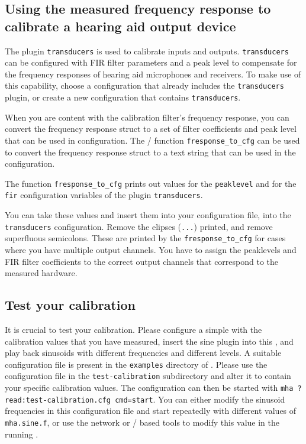 \documentclass[11pt,a4paper,twoside]{article}
\newcommand{\+}{\discretionary{\mbox{\scriptsize$\hookleftarrow$}}{}{}}
\begin{document}
\subsection{Using the measured frequency response to calibrate a hearing aid output device}

The \mha{} plugin \texttt{transducers} is used to calibrate inputs and outputs.
%
\texttt{transducers} can be configured with FIR filter parameters and a peak level
to compensate for the frequency responses of hearing aid microphones and receivers.
%
To make use of this capability, choose a \mha{} configuration that already includes
the \texttt{transducers} plugin, or create a new configuration that contains
\texttt{transducers}.

When you are content with the calibration filter's frequency response,
you can convert the frequency response struct to a set of filter
coefficients and peak level that can be used in \mha{} configuration.
%
The \Octave{}/\Matlab{} function \texttt{fresponse\_to\_cfg} can be
used to convert the frequency response struct to a text string that
can be used in the \mha{} configuration.

The function \texttt{fresponse\_to\_cfg} prints out values for the
\texttt{peaklevel} and for the \texttt{fir} configuration variables of
the \mha{} plugin \texttt{transducers}.

You can take these values and insert them into your configuration file,
into the \texttt{transducers} configuration.
%
Remove the elipses (\texttt{...}) printed, and remove superfluous
semicolons.
%
These are printed by the \texttt{fresponse\_to\_cfg} for cases where
you have multiple output channels. You have to assign the peaklevels
and FIR filter coefficients to the correct output channels that
correspond to the measured hardware.

\subsection{Test your calibration}

It is crucial to test your calibration. Please configure a simple \mha{} with the
calibration values that you have measured, insert the sine plugin into this \mha{},
and play back sinusoids with different frequencies and different levels.
%
A suitable configuration file is present in the \texttt{examples} directory of \mha{}.
%
Please use the configuration file in the \texttt{test-calibration} subdirectory
and alter it to contain your specific calibration values.
%
The configuration can then be started with
\texttt{mha ?read:test-calibration.cfg cmd=start}.
%
You can either modify the sinusoid frequencies in this configuration
file and start \mha{} repeatedly with different values of
\texttt{mha.sine.f}, or use the network or \Octave{}/\Matlab{} based
tools to modify this value in the running \mha{}.
\end{document}
